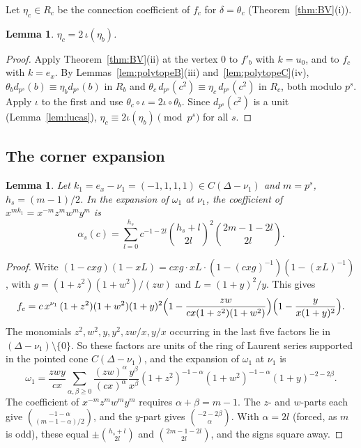 \documentclass[11pt]{amsart}
\newtheorem{lemma}[theorem]{Lemma}
\theoremstyle{definition}
\theoremstyle{remark}
\begin{document}
Let $\eta_c\in R_c$ be the connection coefficient of $f_c$ for $\delta=\theta_c$
(Theorem~\ref{thm:BV}(i)).

\begin{lemma}\label{lem:etac}
$\eta_c=2\,\iota(\eta_b)$.
\end{lemma}
\begin{proof}
Apply Theorem~\ref{thm:BV}(ii) at the vertex $0$ to $f'_b$ with $k=u_0$, and to $f_c$ with $k=e_x$.
By Lemmas~\ref{lem:polytopeB}(iii) and~\ref{lem:polytopeC}(iv),
$\theta_bd_{p^s}(b)\equiv\eta_bd_{p^s}(b)$ in $R_b$ and
$\theta_c\,d_{p^s}(c^2)\equiv\eta_c\,d_{p^s}(c^2)$ in $R_c$, both modulo $p^s$. Apply $\iota$ to
the first and use $\theta_c\circ\iota=2\iota\circ\theta_b$. Since $d_{p^s}(c^2)$ is a unit
(Lemma~\ref{lem:lucas}), $\eta_c\equiv2\iota(\eta_b)\pmod{p^s}$ for all $s$.
\end{proof}

\subsection{The corner expansion}
\begin{lemma}\label{lem:corner}
Let $k_1=e_x-\nu_1=(-1,1,1,1)\in C(\Delta-\nu_1)$ and $m=p^s$, $h_s=(m-1)/2$. In the expansion of
$\omega_1$ at $\nu_1$, the coefficient of $x^{mk_1}=x^{-m}z^mw^my^m$ is
\[
 \alpha_s(c)=\sum_{l=0}^{h_s}c^{-1-2l}\binom{h_s+l}{2l}^2\binom{2m-1-2l}{2l}.
\]
\end{lemma}
\begin{proof}
Write $(1-cxg)(1-xL)=cxg\cdot xL\cdot(1-(cxg)^{-1})(1-(xL)^{-1})$, with
$g=(1+z^2)(1+w^2)/(zw)$ and $L=(1+y)^2/y$. This gives
\[
 f_c=c\,x^{\nu_1}\,(1+z^2)(1+w^2)(1+y)^2\Bigl(1-\frac{zw}{cx(1+z^2)(1+w^2)}\Bigr)\Bigl(1-\frac{y}{x(1+y)^2}\Bigr).
\]
The monomials $z^2,w^2,y,y^2,zw/x,y/x$ occurring in the last five factors lie in
$(\Delta-\nu_1)\setminus\{0\}$. So these factors are units of the ring of Laurent series supported
in the pointed cone $C(\Delta-\nu_1)$, and the expansion of $\omega_1$ at $\nu_1$ is
\[
 \omega_1=\frac{zwy}{cx}\sum_{\alpha,\beta\ge0}\frac{(zw)^\alpha}{(cx)^\alpha}\frac{y^\beta}{x^\beta}
 (1+z^2)^{-1-\alpha}(1+w^2)^{-1-\alpha}(1+y)^{-2-2\beta}.
\]
The coefficient of $x^{-m}z^mw^my^m$ requires $\alpha+\beta=m-1$. The $z$- and $w$-parts each
give $\binom{-1-\alpha}{(m-1-\alpha)/2}$, and the $y$-part gives $\binom{-2-2\beta}{\alpha}$. With
$\alpha=2l$ (forced, as $m$ is odd), these equal $\pm\binom{h_s+l}{2l}$ and $\binom{2m-1-2l}{2l}$,
and the signs square away.
\end{proof}
\end{document}
